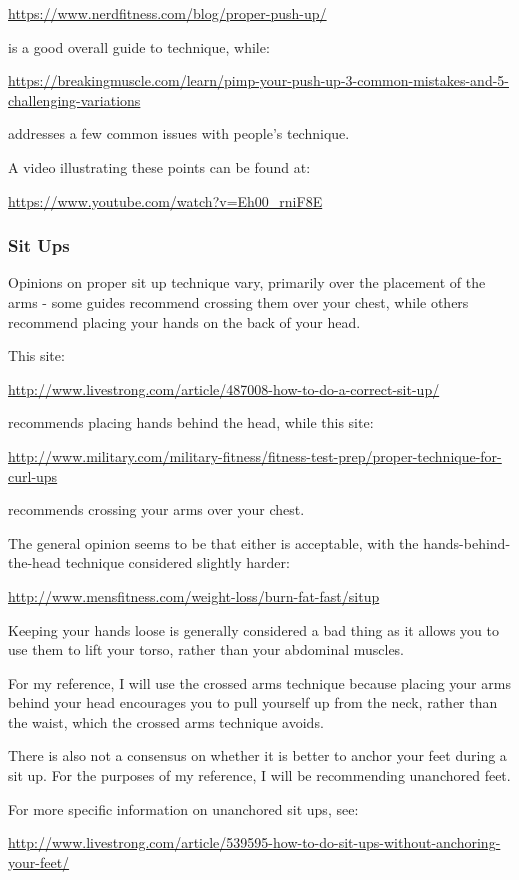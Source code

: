 \documentclass[a4paper]{article}
\begin{document}
\url{https://www.nerdfitness.com/blog/proper-push-up/} 

is a good overall guide to technique, while:

\url{https://breakingmuscle.com/learn/pimp-your-push-up-3-common-mistakes-and-5-challenging-variations}

addresses a few common issues with people's technique.

A video illustrating these points can be found at:

\url{https://www.youtube.com/watch?v=Eh00_rniF8E}

\subsubsection{Sit Ups}

Opinions on proper sit up technique vary, primarily over the placement of the arms - some guides recommend crossing them over your chest, while others recommend placing your hands on the back of your head. 

This site:

\url{http://www.livestrong.com/article/487008-how-to-do-a-correct-sit-up/} 

recommends placing hands behind the head, while this site:

\url{http://www.military.com/military-fitness/fitness-test-prep/proper-technique-for-curl-ups}

recommends crossing your arms over your chest. 

The general opinion seems to be that either is acceptable, with the hands-behind-the-head technique considered slightly harder:

\url{http://www.mensfitness.com/weight-loss/burn-fat-fast/situp} 

Keeping your hands loose is generally considered a bad thing as it allows you to use them to lift your torso, rather than your abdominal muscles. 

For my reference, I will use the crossed arms technique because placing your arms behind your head encourages you to pull yourself up from the neck, rather than the waist, which the crossed arms technique avoids.

There is also not a consensus on whether it is better to anchor your feet during a sit up. For the purposes of my reference, I will be recommending unanchored feet. 

For more specific information on unanchored sit ups, see:

\url{http://www.livestrong.com/article/539595-how-to-do-sit-ups-without-anchoring-your-feet/}
\end{document}
